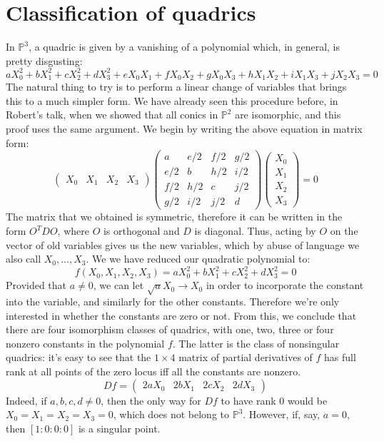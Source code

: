 \documentclass[12 pt]{article}
\newcommand{\Proj}{\mathbb{P}}
\begin{document}
\section{Classification of quadrics}
In $\Proj^3$, a quadric is given by a vanishing of a polynomial which, in general, is pretty disgusting:
\[	a X_0^2 + bX_1^2 + cX_2^2 + dX_3^2 + e X_0 X_1 + fX_0 X_2 + g X_0 X_3 + hX_1X_2 + iX_1X_3 + jX_2X_3 = 0	\]
The natural thing to try is to perform a linear change of variables that brings this to a much simpler form. We have already seen this procedure
before, in Robert's talk, when we showed that all conics in $\Proj^2$ are isomorphic, and this proof uses the same argument. We begin by
writing the above equation in matrix form:
\[	\left( \begin{array} {cccc}  X_0 & X_1 & X_2 & X_3  \end{array} \right)
	\left( \begin{array} {cccc}  a & e/2 & f/2 & g/2 \\ e/2 & b& h/2 & i/2 \\ f/2 & h/2 & c & j/2 \\ g/2 & i/2 & j/2 & d \end{array} \right)
	\left( \begin{array} {c}  X_0 \\ X_1 \\ X_2 \\ X_3 \end{array} \right)  = 0	\]
The matrix that we obtained is symmetric, therefore it can be written in the form $O^T D O$, where $O$ is orthogonal and $D$ is diagonal.
Thus, acting by $O$ on the vector of old variables gives us the new variables, which by abuse of language we also call $X_0, \dots, X_3$. We
we have reduced our quadratic polynomial to:
\[	f(X_0, X_1, X_2, X_3) = a X_0^2 + bX_1^2 + cX_2^2 + dX_3^2 = 0	\]
Provided that $a \neq 0$, we can let $\sqrt{a} X_0 \to X_0$ in order to incorporate the constant into the variable, and similarly for the other
constants. Therefore we're only interested in whether the constants are zero or not. From this, we conclude that there are four isomorphism classes of
quadrics, with one, two, three or four nonzero constants in the polynomial $f$. The latter is the class of nonsingular quadrics: it's easy to see
that the $1\times 4$ matrix of partial derivatives of $f$ has full rank at all points of the zero locus iff all the constants are nonzero.
\[             Df = \left( \begin{array} {cccc} 2aX_0 & 2bX_1 & 2cX_2 & 2dX_3 \end{array} \right)            \]
Indeed, if $a,b,c,d \neq 0$, then the only way for $Df$ to have rank 0 would be $X_0 = X_1 = X_2 = X_3 = 0$, which does not belong to $\Proj^3$.
However, if, say, $a = 0$, then $[1:0:0:0]$ is a singular point.
\end{document}
